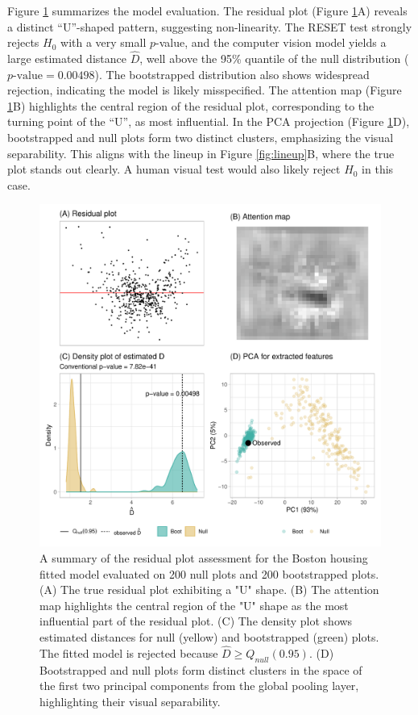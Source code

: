 \documentclass[]{interact}
\theoremstyle{plain}%
\theoremstyle{definition}
\theoremstyle{remark}
\begin{document}
Figure \ref{fig:boston-check} summarizes the model evaluation. The
residual plot (Figure \ref{fig:boston-check}A) reveals a distinct
``U''-shaped pattern, suggesting non-linearity. The RESET test strongly
rejects \(H_0\) with a very small \(p\)-value, and the computer vision
model yields a large estimated distance \(\hat{D}\), well above the 95\%
quantile of the null distribution (\(p\text{-value} = 0.00498\)). The
bootstrapped distribution also shows widespread rejection, indicating
the model is likely misspecified. The attention map (Figure
\ref{fig:boston-check}B) highlights the central region of the residual
plot, corresponding to the turning point of the ``U'', as most
influential. In the PCA projection (Figure \ref{fig:boston-check}D),
bootstrapped and null plots form two distinct clusters, emphasizing the
visual separability. This aligns with the lineup in Figure
\ref{fig:lineup}B, where the true plot stands out clearly. A human
visual test would also likely reject \(H_0\) in this case.

\begin{figure}[!h]

{\centering \includegraphics[width=0.8\linewidth]{paper_files/figure-latex/boston-check-1} 

}

\caption{A summary of the residual plot assessment for the Boston housing fitted model evaluated on 200 null plots and 200 bootstrapped plots. (A) The true residual plot exhibiting a "U" shape. (B) The attention map highlights the central region of the "U" shape as the most influential part of the residual plot. (C) The density plot shows estimated distances for null (yellow) and bootstrapped (green) plots. The fitted model is rejected because $\hat{D} \geq Q_{null}(0.95)$. (D) Bootstrapped and null plots form distinct clusters in the space of the first two principal components from the global pooling layer, highlighting their visual separability.}\label{fig:boston-check}
\end{figure}
\end{document}
